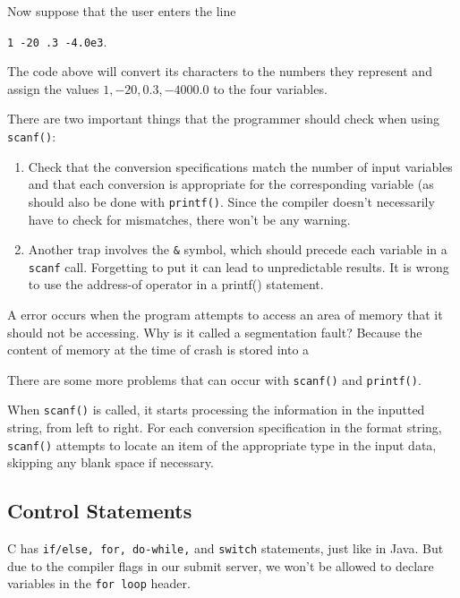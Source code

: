 \lstset{
caption=Reading Variables
}
\begin{center}

\end{center}

Now suppose that the user enters the line \begin{center}
\verb!1 -20 .3 -4.0e3!.
\end{center}

The code above will convert its characters to the numbers they represent and assign the values $1, -20, 0.3, -4000.0$ to the four variables. 


There are two important things that the programmer should check when using \verb!scanf()!: \begin{enumerate}
    \item Check that the conversion specifications match the number of input variables and that each conversion is appropriate for the corresponding variable (as should also be done with \verb!printf()!. Since the compiler doesn't necessarily have to check for mismatches, there won't be any warning.
    \item Another trap involves the \verb!&! symbol, which should precede each variable in a \verb!scanf! call. Forgetting to put it can lead to unpredictable results. It is wrong to use the address-of operator in a printf() statement. 
\end{enumerate}


A  error occurs when the program attempts to access an area of memory that it should not be accessing. Why is it called a segmentation fault? Because the content of memory at the time of crash is stored into a 



There are some more problems that can occur with \verb!scanf()! and \verb!printf()!.


When \verb!scanf()! is called, it starts processing the information in the inputted string, from left to right. For each conversion specification in the format string, \verb!scanf()! attempts to locate an item of the appropriate type in the input data, skipping any blank space if necessary.





\subsection{Control Statements}
C has \verb!if/else, for, do-while,! and \verb!switch! statements, just like in Java. But due to the compiler flags in our submit server, we won't be allowed to declare variables in the \verb!for loop! header. 

